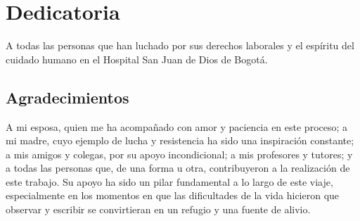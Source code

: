 \section*{Dedicatoria}

\vspace{2cm}

A todas las personas que han luchado por sus derechos laborales y el espíritu del cuidado humano en el Hospital San Juan de Dios de Bogotá.

\vspace{4cm}

\subsection*{Agradecimientos}
A mi esposa, quien me ha acompañado con amor y paciencia en este proceso; a mi madre, cuyo ejemplo de lucha y resistencia ha sido una inspiración constante; a mis amigos y colegas, por su apoyo incondicional; a mis profesores y tutores; y a todas las personas que, de una forma u otra, contribuyeron a la realización de este trabajo. Su apoyo ha sido un pilar fundamental a lo largo de este viaje, especialmente en los momentos en que las dificultades de la vida hicieron que observar y escribir se convirtieran en un refugio y una fuente de alivio.
\pagebreak